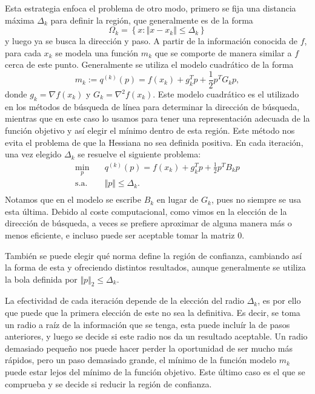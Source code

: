 \documentclass[11pt,a4paper]{book}
\theoremstyle{definition}
\theoremstyle{remark}
\begin{document}
Esta estrategia enfoca el problema de otro modo, primero se fija una distancia máxima $\Delta_k$ para definir la región, que generalmente es de la forma
\begin{equation}
	\Omega_k = \left\{x : \Vert x-x_k \Vert \leq \Delta_k \right\}
\end{equation}
y luego ya se busca la dirección y paso.
A partir de la información conocida de $f$, para cada $x_k$ se modela una función $m_k$ que se comporte de manera similar a $f$ cerca de este punto.
Generalmente se utiliza el modelo cuadrático de la forma
\begin{equation}
	m_k := q^{(k)}(p) = f(x_k) + g^T_kp + \frac{1}{2}p^TG_kp,
\end{equation}
donde $g_k = \nabla f(x_k)$ y $G_k = \nabla^2f(x_k)$.
Este modelo cuadrático es el utilizado en los métodos de búsqueda de línea para determinar la dirección de búsqueda, mientras que en este caso lo usamos para tener una representación adecuada de la función objetivo y así elegir el mínimo dentro de esta región.
Este método nos evita el problema de que la Hessiana no sea definida positiva.
En cada iteración, una vez elegido $\Delta_k$ se resuelve el siguiente problema:
\begin{equation}
\begin{aligned}
	\min_{p} \quad & q^{(k)}(p) = f(x_k) + g^T_kp + \frac{1}{2}p^TB_kp \\
	\text{s.a.} \quad & \Vert p \Vert \leq \Delta_k. \\
\end{aligned}
\end{equation}
Notamos que en el modelo se escribe $B_k$ en lugar de $G_k$, pues no siempre se usa esta última.
Debido al coste computacional, como vimos en la elección de la dirección de búsqueda, a veces se prefiere aproximar de alguna manera más o menos eficiente, e incluso puede ser aceptable tomar la matriz $0$.

También se puede elegir qué norma define la región de confianza, cambiando así la forma de esta y ofreciendo distintos resultados, aunque generalmente se utiliza la bola definida por $\Vert p \Vert_2 \leq \Delta_k$.

La efectividad de cada iteración depende de la elección del radio $\Delta_k$, es por ello que puede que la primera elección de este no sea la definitiva. Es decir, se toma un radio a raíz de la información que se tenga, esta puede incluír la de pasos anteriores, y luego se decide si este radio nos da un resultado aceptable. Un radio demasiado pequeño nos puede hacer perder la oportunidad de ser mucho más rápidos, pero un paso demasiado grande, el mínimo de la función modelo $m_k$ puede estar lejos del mínimo de la función objetivo. Este último caso es el que se comprueba y se decide si reducir la región de confianza.
\end{document}
